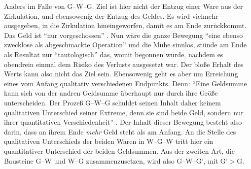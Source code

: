 \documentclass[12pt,
               paper=a4,
               twoside=false,
               onehalfspacing,
               bibliography=totoc,
               toc=graduated,
               ]{scrartcl}
\newcommand{\pc}[2]{\parencite[#1]{#2}}
\newcommand{\vgl}[2]{\parencite[vgl.][#1]{#2}}
\newcommand{\worries}[1]{\ifdraft{\textcolor{blue}{\texttt{(#1)}}}{}}
\newcommand{\gwg}{G--W--G'\xspace}
\newcommand{\wgw}{W--G--W\xspace}
\begin{document}
Anders im Falle von G--W--G. Ziel ist hier nicht der Entzug einer Ware
aus der Zirkulation, und ebensowenig der Entzug des Geldes. Es wird
vielmehr ausgegeben, in die Zirkulation hineingeworfen, damit es am
Ende zurückkommt. Das Geld ist "`nur vorgeschossen"' \pc{163}{kap}.
Nun wäre die ganze Bewegung "`eine ebenso zwecklose als abgeschmackte
Operation"' \pc{165}{kap} und die Mühe sinnlos, stünde am Ende als
Resultat nur "`tautologisch"' \pc{164}{kap} das, womit begonnen wurde,
nachdem es obendrein einmal dem Risiko des Verlusts ausgesetzt war.
Der bloße Erhalt des Werts kann also nicht das Ziel sein. Ebensowenig
geht es aber um Erreichung eines vom Anfang qualitativ verschiedenen
Endpunkts. Denn: "`Eine Geldsumme kann sich von der andren Geldsumme
überhaupt nur durch ihre Größe unterscheiden. Der Prozeß G--W--G
schuldet seinen Inhalt daher keinem qualitativen Unterschied seiner
Extreme, denn sie sind beide Geld, sondern nur ihrer quantitativen
Verschiedenheit"' \pc{165}{kap}. Der Inhalt dieser Bewegung besteht
also darin, dass an ihrem Ende \emph{mehr} Geld steht als am Anfang.
An die Stelle des qualitativen Unterschieds der beiden Waren in \wgw
tritt hier ein quantitativer Unterschied der beiden Geldsummen. Aus
der zweiten Art, die Bausteine G--W und W--G zusammenzusetzen, wird
also \gwg, mit G'$>$G.


\end{document}
